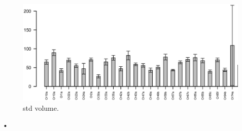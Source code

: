 \documentclass[11pt]{paper} %
\begin{document}
\begin{figure}
\includegraphics[width=\textwidth]{fig/std-vol}
\caption{std volume.}
\end{figure}•
\end{document}
